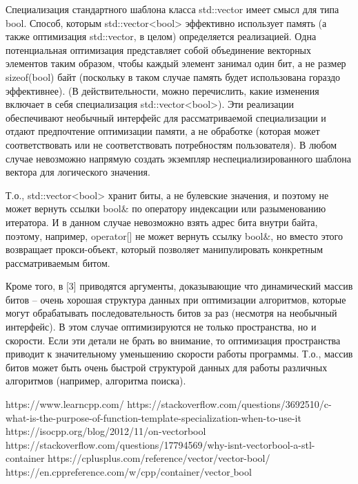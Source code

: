 \documentclass[a4paper,12pt]{article}	%
\begin{document}
	Специализация стандартного шаблона класса std::vector имеет смысл для типа bool. Способ, которым std::vector<bool> эффективно использует память (а также оптимизация std::vector, в целом) определяется реализацией. Одна потенциальная оптимизация представляет собой объединение векторных элементов таким образом, чтобы каждый элемент занимал один бит, а не размер sizeof(bool) байт (поскольку в таком случае память будет использована гораздо эффективнее). (В действительности, можно перечислить, какие изменения включает в себя специализация std::vector<bool>). Эти реализации обеспечивают необычный интерфейс для рассматриваемой специализации и отдают предпочтение оптимизации памяти, а не обработке (которая может соответствовать или не соответствовать потребностям пользователя). В любом случае невозможно напрямую создать экземпляр неспециализированного шаблона вектора для логического значения.
	
	Т.о., std::vector<bool> хранит биты, а не булевские значения, и поэтому не может вернуть ссылки bool$\&$ по оператору индексации или разыменованию итератора. И в данном случае невозможно взять адрес бита внутри байта, поэтому, например, operator[] не может вернуть ссылку bool$\&$, но вместо этого возвращает прокси-объект, который позволяет манипулировать конкретным рассматриваемым битом.
	
	Кроме того, в [3] приводятся аргументы, доказывающие что динамический массив битов -- очень хорошая структура данных при оптимизации алгоритмов, которые могут обрабатывать последовательность битов за раз (несмотря на необычный интерфейс). В этом случае оптимизируются не только пространства, но и скорости. Если эти детали не брать во внимание, то оптимизация пространства приводит к значительному уменьшению скорости работы программы. Т.о., массив битов может быть очень быстрой структурой данных для работы различных алгоритмов (например, алгоритма поиска).

\newpage


 
	\begin{thebibliography}{}
	
    	 https://www.learncpp.com/
		 https://stackoverflow.com/questions/3692510/c-what-is-the-purpose-of-function-template-specialization-when-to-use-it
		 https://isocpp.org/blog/2012/11/on-vectorbool
		 https://stackoverflow.com/questions/17794569/why-isnt-vectorbool-a-stl-container
		 https://cplusplus.com/reference/vector/vector-bool/
		 https://en.cppreference.com/w/cpp/container/vector$\_$bool
		
	\end{thebibliography}
\end{document}
